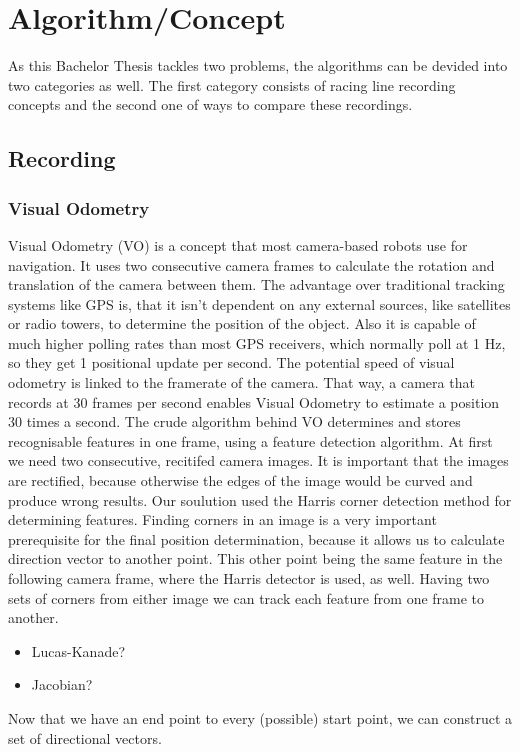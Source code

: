 \section{Algorithm/Concept}
\label{sec:algorithm}
As this Bachelor Thesis tackles two problems, the algorithms can be devided into two categories as well.
The first category consists of racing line recording concepts and the second one of ways to compare these recordings.

\subsection{Recording}
\subsubsection{Visual Odometry}
Visual Odometry (VO) is a concept that most camera-based robots use for navigation. It uses two consecutive camera frames to calculate the rotation and translation of the camera between them. The advantage over traditional tracking systems like GPS is, that it isn't dependent on any external sources, like satellites or radio towers, to determine the position of the object.
Also it is capable of much higher polling rates than most GPS receivers, which normally poll at 1 Hz, so they get 1 positional update per second. The potential speed of visual odometry is linked to the framerate of the camera. That way, a camera that records at 30 frames per second enables Visual Odometry to estimate a position 30 times a second. 
The crude algorithm behind VO determines and stores recognisable features in one frame, using a feature detection algorithm.
At first we need two consecutive, recitifed camera images. It is important that the images are rectified, because otherwise the edges of the image would be curved and produce wrong results.
Our soulution used the Harris corner detection method for determining features. Finding corners in an image is a very important prerequisite for the final position determination, because it allows us to calculate direction vector to another point. This other point being the same feature in the following camera frame, where the Harris detector is used, as well.
Having two sets of corners from either image we can track each feature from one frame to another. 
\begin{itemize}
    \item Lucas-Kanade?
    \item Jacobian?
\end{itemize}
Now that we have an end point to every (possible) start point, we can construct a set of directional vectors.
